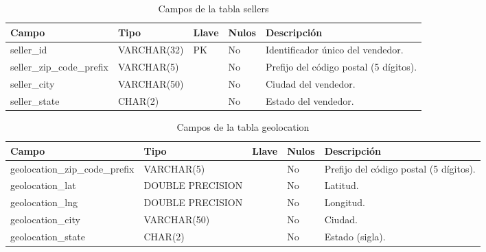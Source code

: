 \documentclass[a4paper,stu,12pt,donotrepeattitle,floatsintext]{apa7}
\begin{document}
{\footnotesize
\begin{longtable}{|>{\raggedright\arraybackslash}p{}|>{\raggedright\arraybackslash}p{}|>{\raggedright\arraybackslash}p{}|>{\raggedright\arraybackslash}p{}|>{\raggedright\arraybackslash}p{}|}
\caption{Campos de la tabla sellers}\\
\hline
\textbf{Campo} & \textbf{Tipo} & \textbf{Llave} & \textbf{Nulos} & \textbf{Descripción} \\ \hline
\endhead
seller\_\allowbreak{}id & VARCHAR(32) & PK & No & Identificador único del vendedor. \\ \hline
seller\_\allowbreak{}zip\_\allowbreak{}code\_\allowbreak{}prefix & VARCHAR(5) &  & No & Prefijo del código postal (5 dígitos). \\ \hline
seller\_\allowbreak{}city & VARCHAR(50) &  & No & Ciudad del vendedor. \\ \hline
seller\_\allowbreak{}state & CHAR(2) &  & No & Estado del vendedor. \\ \hline
\end{longtable}
}
{\footnotesize
\begin{longtable}{|>{\raggedright\arraybackslash}p{}|>{\raggedright\arraybackslash}p{}|>{\raggedright\arraybackslash}p{}|>{\raggedright\arraybackslash}p{}|>{\raggedright\arraybackslash}p{}|}
\caption{Campos de la tabla geolocation}\\
\hline
\textbf{Campo} & \textbf{Tipo} & \textbf{Llave} & \textbf{Nulos} & \textbf{Descripción} \\ \hline
\endhead
geolocation\_\allowbreak{}zip\_\allowbreak{}code\_\allowbreak{}prefix & VARCHAR(5) &  & No & Prefijo del código postal (5 dígitos). \\ \hline
geolocation\_\allowbreak{}lat & DOUBLE PRECISION &  & No & Latitud. \\ \hline
geolocation\_\allowbreak{}lng & DOUBLE PRECISION &  & No & Longitud. \\ \hline
geolocation\_\allowbreak{}city & VARCHAR(50) &  & No & Ciudad. \\ \hline
geolocation\_\allowbreak{}state & CHAR(2) &  & No & Estado (sigla). \\ \hline
\end{longtable}
}
\end{document}
